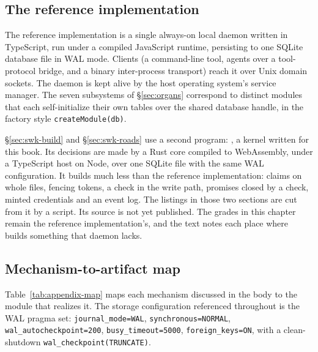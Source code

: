 \documentclass[11pt,a4paper]{article}
\theoremstyle{definition}
\theoremstyle{remark}
\begin{document}
\subsection{The reference implementation}

The reference implementation is a single always-on local daemon written in
TypeScript, run under a compiled JavaScript runtime, persisting to one SQLite
database file in WAL mode. Clients (a command-line tool, agents over a
tool-protocol bridge, and a binary inter-process transport) reach it over Unix
domain sockets. The daemon is kept alive by the host operating system's service
manager. The seven subsystems of \S\ref{sec:organs} correspond to distinct modules
that each self-initialize their own tables over the shared database handle, in the
factory style \texttt{createModule(db)}.

\S\ref{sec:swk-build} and \S\ref{sec:swk-roads} use a second program:
\pdkernelname{}, a kernel written for this book. Its decisions are made by a Rust core compiled
to WebAssembly, under a TypeScript host on Node, over one SQLite file with
the same WAL configuration. It builds much less than the reference
implementation: claims on whole files, fencing tokens, a check in the write
path, promises closed by a check, minted credentials and an event log. The
listings in those two sections are cut from it by a script. Its source is not yet
published. The grades in this chapter remain the reference implementation's,
and the text notes each place where \pdkernelname{} builds something that
daemon lacks.

\subsection{Mechanism-to-artifact map}

Table~\ref{tab:appendix-map} maps each mechanism discussed in the body to the
module that realizes it. The storage configuration referenced throughout is the WAL
pragma set: \texttt{journal\_mode=WAL}, \texttt{synchronous=NORMAL},
\texttt{wal\_autocheckpoint=200}, \texttt{busy\_timeout=5000},
\texttt{foreign\_keys=ON}, with a clean-shutdown \texttt{wal\_checkpoint(TRUNCATE)}.
\end{document}
